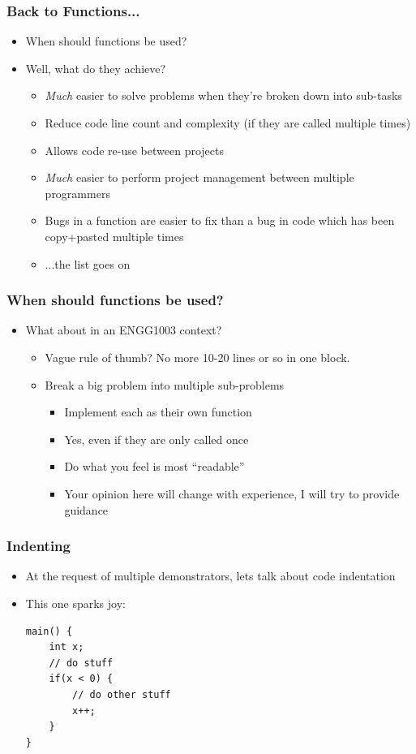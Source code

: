 \documentclass[14pt]{beamer}
\begin{document}
\begin{frame}
\frametitle{Back to Functions...}
\begin{itemize}
\item When should functions be used?
\pause
\item Well, what do they achieve?
	\begin{itemize}
		\item \textit{Much} easier to solve problems when they're broken down into sub-tasks
		\item Reduce code line count and complexity (if they are called multiple times)
		\item Allows code re-use between projects
		\item \textit{Much} easier to perform project management between multiple programmers
		\item Bugs in a function are easier to fix than a bug in code which has been copy+pasted multiple times
		\item ...the list goes on
	\end{itemize}
\end{itemize}
\end{frame}

\begin{frame}
\frametitle{When should functions be used?}
\begin{itemize}
\item What about in an ENGG1003 context?
\pause
	\begin{itemize}
		\item Vague rule of thumb? No more 10-20 lines or so in one block.
		\item Break a big problem into multiple sub-problems
			\begin{itemize}
				\item Implement each as their own function
				\pause
				\item Yes, even if they are only called once
				\pause
				\item Do what you feel is most ``readable''
				\pause
				\item Your opinion here will change with experience, I will try to provide guidance
			\end{itemize}
	\end{itemize}
\end{itemize}
\end{frame}

\begin{frame}[fragile]
\frametitle{Indenting}
\begin{itemize}
\item At the request of multiple demonstrators, lets talk about code indentation
\pause
\item This one sparks joy:
\begin{lstlisting}[style=CStyle]
main() {
	int x;
	// do stuff
	if(x < 0) {
		// do other stuff
		x++;
	}
}
\end{lstlisting}
\end{itemize}
\end{frame}
\end{document}
